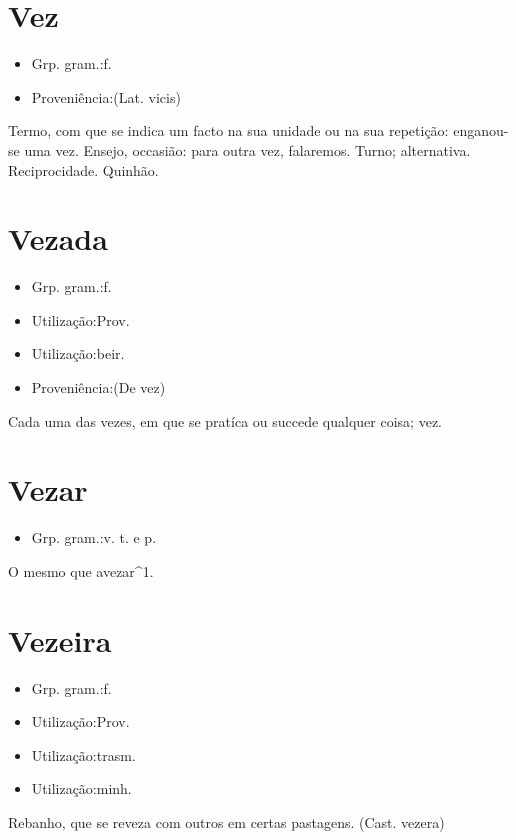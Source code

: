 \documentclass{article}
\begin{document}
\section{Vez}
\begin{itemize}
\item {Grp. gram.:f.}
\end{itemize}
\begin{itemize}
\item {Proveniência:(Lat. \textunderscore vicis\textunderscore )}
\end{itemize}
Termo, com que se indica um facto na sua unidade ou na sua repetição: \textunderscore enganou-se uma vez\textunderscore .
Ensejo, occasião: \textunderscore para outra vez, falaremos\textunderscore .
Turno; alternativa.
Reciprocidade.
Quinhão.
\section{Vezada}
\begin{itemize}
\item {Grp. gram.:f.}
\end{itemize}
\begin{itemize}
\item {Utilização:Prov.}
\end{itemize}
\begin{itemize}
\item {Utilização:beir.}
\end{itemize}
\begin{itemize}
\item {Proveniência:(De \textunderscore vez\textunderscore )}
\end{itemize}
Cada uma das vezes, em que se pratíca ou succede qualquer coisa; vez.
\section{Vezar}
\begin{itemize}
\item {Grp. gram.:v. t.  e  p.}
\end{itemize}
O mesmo que \textunderscore avezar\textunderscore ^1.
\section{Vezeira}
\begin{itemize}
\item {Grp. gram.:f.}
\end{itemize}
\begin{itemize}
\item {Utilização:Prov.}
\end{itemize}
\begin{itemize}
\item {Utilização:trasm.}
\end{itemize}
\begin{itemize}
\item {Utilização:minh.}
\end{itemize}
Rebanho, que se reveza com outros em certas pastagens.
(Cast. \textunderscore vezera\textunderscore )
\end{document}
